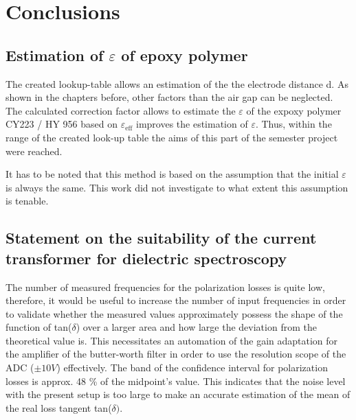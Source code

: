 \chapter{Conclusions}
\section{Estimation of $\varepsilon$ of epoxy polymer}
The created lookup-table allows an estimation of the the electrode distance d.  As shown in the chapters before, other factors than the air gap can be neglected. The calculated correction factor allows to estimate the $\varepsilon$ of the expoxy polymer CY223 / HY 956 based on $\varepsilon_{\textrm{eff}}$ improves the estimation of $\varepsilon$. Thus, within the range of the created look-up table the aims of this part of the semester project were reached. 

It has to be noted that this method is based on the assumption that the initial $\varepsilon$ is always the same. This work did not investigate to what extent this assumption is tenable. 

\section{Statement on the suitability of the current transformer for dielectric spectroscopy}

The number of measured frequencies for the polarization losses is quite low, therefore, it would be useful to increase the number of input frequencies in order to validate whether the measured values approximately possess the shape of the function of tan($\delta$) over a larger area and how large the deviation from the theoretical value is. This necessitates an automation of the gain adaptation for the amplifier of the butter-worth filter in order to use the resolution scope of the ADC ($\pm 10V$)  effectively. 
The band of the confidence interval for polarization losses is approx. 48 \% of the midpoint's value. This indicates that the noise level with the present setup is too large to make an accurate estimation of the mean of the real loss tangent tan($\delta)$.





